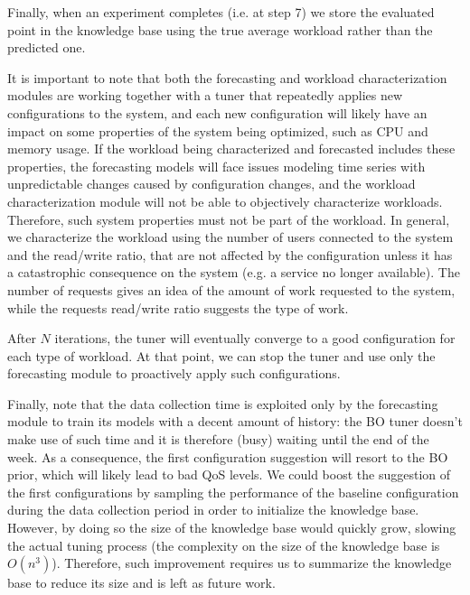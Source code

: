 \documentclass[a4paper, 12pt]{article} %
\begin{document}
	Finally, when an experiment completes (i.e. at step 7) we store the evaluated point in the knowledge base using the true average workload rather than the predicted one.
	
	It is important to note that both the forecasting and workload characterization modules are working together with a tuner that repeatedly applies new configurations to the system, and each new configuration will likely have an impact on some properties of the system being optimized, such as CPU and memory usage. If the workload being characterized and forecasted includes these properties, the forecasting models will face issues modeling time series with unpredictable changes caused by configuration changes, and the workload characterization module will not be able to objectively characterize workloads. Therefore, such system properties must not be part of the workload. In general, we characterize the workload using the number of users connected to the system and the read/write ratio, that are not affected by the configuration unless it has a catastrophic consequence on the system (e.g. a service no longer available). The number of requests gives an idea of the amount of work requested to the system, while the requests read/write ratio suggests the type of work.
	
	After $N$ iterations, the tuner will eventually converge to a good configuration for each type of workload. At that point, we can stop the tuner and use only the forecasting module to proactively apply such configurations.
	
	Finally, note that the data collection time is exploited only by the forecasting module to train its models with a decent amount of history: the BO tuner doesn't make use of such time and it is therefore (busy) waiting until the end of the week. As a consequence, the first configuration suggestion will resort to the BO prior, which will likely lead to bad QoS levels. We could boost the suggestion of the first configurations by sampling the performance of the baseline configuration during the data collection period in order to initialize the knowledge base. However, by doing so the size of the knowledge base would quickly grow, slowing the actual tuning process (the complexity on the size of the knowledge base is $O(n^3)$). Therefore, such improvement requires us to summarize the knowledge base to reduce its size and is left as future work.
\end{document}
